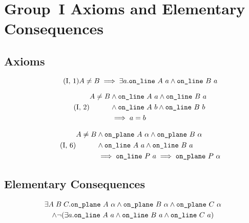\chapter{Group~I Axioms and Elementary Consequences}\label{app:group1}

\section{Axioms}
\begin{equation}\label{eq:g11}
  \tag{I, 1}
    A \neq B \implies \exists a. \texttt{on\_line}\ A\ a \wedge \texttt{on\_line}\ B\ a
\end{equation}

\begin{equation}\label{eq:g12}
  \tag{I, 2}
  \begin{split}
    A \neq B &\wedge \code{on\_line}\ A\ a \wedge \code{on\_line}\ B\ a\\
    &\wedge \code{on\_line}\ A\ b \wedge \code{on\_line}\ B\ b\\
    &\implies a = b
  \end{split}
\end{equation}

\begin{equation}\label{eq:g16}
  \tag{I, 6}
  \begin{split}
    A \neq B &\wedge \code{on\_plane}\ A\ \alpha \wedge \code{on\_plane}\ B\ \alpha\\
    &\wedge \code{on\_line}\ A\ a \wedge \code{on\_line}\ B\ a\\
    &\implies \code{on\_line}\ P\ a \implies \code{on\_plane}\ P\ \alpha
  \end{split}
\end{equation}

\section{Elementary Consequences}
\begin{multline}\label{eq:PlaneThree}
  \exists A\;B\;C. \code{on\_plane}\ A\ \alpha\wedge\code{on\_plane}\ B\ \alpha\wedge\code{on\_plane}\ C\ \alpha\\
  \wedge \Triangle{a}{A}{B}{C}
\end{multline}

